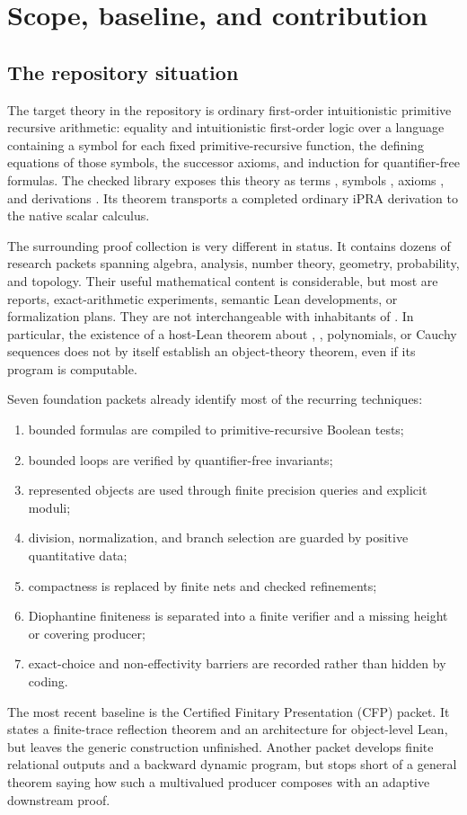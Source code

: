 \section{Scope, baseline, and contribution}
\label{sec:scope}

\subsection{The repository situation}

The target theory in the repository is ordinary first-order intuitionistic primitive recursive arithmetic: equality and intuitionistic first-order logic over a language containing a symbol for each fixed primitive-recursive function, the defining equations of those symbols, the successor axioms, and induction for quantifier-free formulas.  The checked  library exposes this theory as terms , symbols , axioms , and derivations .  Its theorem  transports a completed ordinary iPRA derivation to the native scalar calculus.

The surrounding proof collection is very different in status.  It contains dozens of research packets spanning algebra, analysis, number theory, geometry, probability, and topology.  Their useful mathematical content is considerable, but most are reports, exact-arithmetic experiments, semantic Lean developments, or formalization plans.  They are not interchangeable with inhabitants of .  In particular, the existence of a host-Lean theorem about , , polynomials, or Cauchy sequences does not by itself establish an object-theory theorem, even if its program is computable.

Seven foundation packets already identify most of the recurring techniques:
\begin{enumerate}[label=(\roman*)]
\item bounded formulas are compiled to primitive-recursive Boolean tests;
\item bounded loops are verified by quantifier-free invariants;
\item represented objects are used through finite precision queries and explicit moduli;
\item division, normalization, and branch selection are guarded by positive quantitative data;
\item compactness is replaced by finite nets and checked refinements;
\item Diophantine finiteness is separated into a finite verifier and a missing height or covering producer;
\item exact-choice and non-effectivity barriers are recorded rather than hidden by coding.
\end{enumerate}
The most recent baseline is the Certified Finitary Presentation (CFP) packet.  It states a finite-trace reflection theorem and an architecture for object-level Lean, but leaves the generic  construction unfinished.  Another packet develops finite relational outputs and a backward dynamic program, but stops short of a general theorem saying how such a multivalued producer composes with an adaptive downstream proof.

